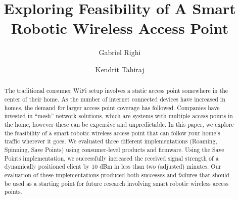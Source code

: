 \documentclass[sigconf]{acmart}
\begin{document}
\title{Exploring Feasibility of A Smart Robotic Wireless Access Point}


\author{Gabriel Righi \and Kendrit Tahiraj}

\renewcommand{\shortauthors}{X.et al.}

\begin{abstract}
The traditional consumer WiFi setup involves a static access point somewhere in the center of their home. As the number of internet connected devices have increased in homes, the demand for larger access point coverage has followed. Companies have invested in “mesh” network solutions, which are systems with multiple access points in the home, however these can be expensive and unpredictable. In this paper, we explore the feasibility of a smart robotic wireless access point that can follow your home’s traffic wherever it goes. We evaluated three different implementations (Roaming, Spinning, Save Points) using consumer-level products and firmware. Using the Save Points implementation, we successfully increased the received signal strength of a dynamically positioned client by 10 dBm in less than two (adjusted) minutes. Our evaluation of these implementations produced both successes and failures that should be used as a starting point for future research involving smart robotic wireless access points.
\end{abstract}

\maketitle





\end{document}
